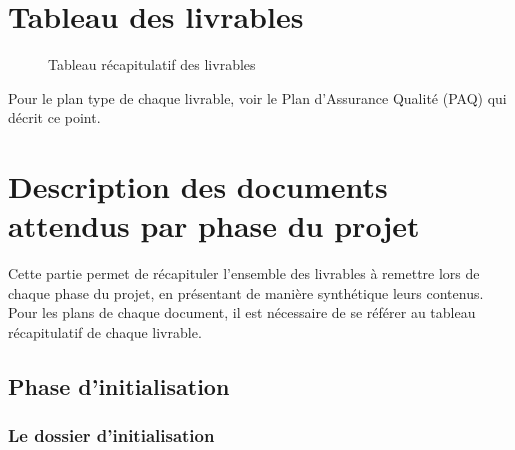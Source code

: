 \let\cleardoublepage\clearpage
\section{Tableau des livrables}

\vspace{-1cm}
\begin{figure}[H]
\noindent{}
\vspace{-3cm}
\caption{Tableau récapitulatif des livrables}
\end{figure}

Pour le plan type de chaque livrable, voir le Plan d'Assurance Qualité (PAQ) qui décrit ce point.

\section{Description des documents attendus par phase du projet}

Cette partie permet de récapituler l’ensemble des livrables à remettre lors de chaque phase du projet, en présentant de manière synthétique leurs contenus. \\

Pour les plans de chaque document, il est nécessaire de se référer au tableau récapitulatif de chaque livrable.

\subsection{Phase d’initialisation}

\subsubsection{Le dossier d’initialisation}


